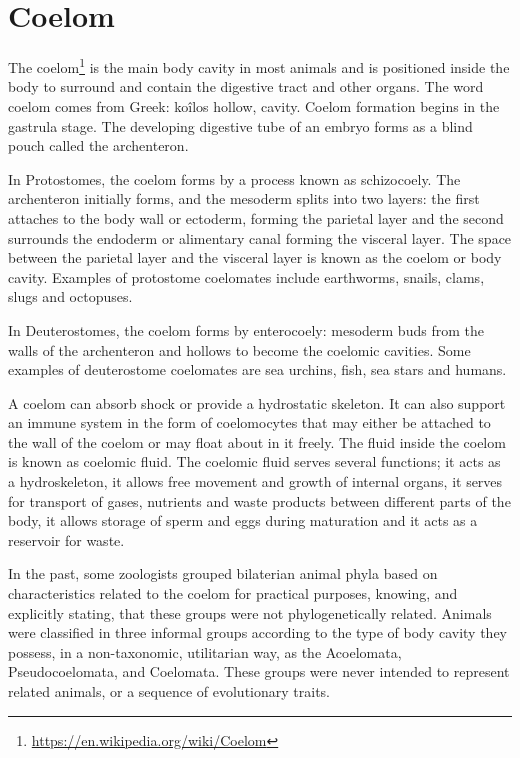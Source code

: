 \documentclass[]{book}
\let\rmarkdownfootnote\footnote%
\def\footnote{\protect\rmarkdownfootnote}
\renewcommand{\href}[2]{#2\footnote{\url{#1}}}
\begin{document}
\hypertarget{coelom}{%
\section{Coelom}\label{coelom}}

The \href{https://en.wikipedia.org/wiki/Coelom}{coelom} is the main body cavity in most animals and is positioned inside the body to surround and contain the digestive tract and other organs. The word coelom comes from Greek: koîlos hollow, cavity. Coelom formation begins in the gastrula stage. The developing digestive tube of an embryo forms as a blind pouch called the archenteron.

In Protostomes, the coelom forms by a process known as schizocoely. The archenteron initially forms, and the mesoderm splits into two layers: the first attaches to the body wall or ectoderm, forming the parietal layer and the second surrounds the endoderm or alimentary canal forming the visceral layer. The space between the parietal layer and the visceral layer is known as the coelom or body cavity. Examples of protostome coelomates include earthworms, snails, clams, slugs and octopuses.

In Deuterostomes, the coelom forms by enterocoely: mesoderm buds from the walls of the archenteron and hollows to become the coelomic cavities. Some examples of deuterostome coelomates are sea urchins, fish, sea stars and humans.

A coelom can absorb shock or provide a hydrostatic skeleton. It can also support an immune system in the form of coelomocytes that may either be attached to the wall of the coelom or may float about in it freely. The fluid inside the coelom is known as coelomic fluid. The coelomic fluid serves several functions; it acts as a hydroskeleton, it allows free movement and growth of internal organs, it serves for transport of gases, nutrients and waste products between different parts of the body, it allows storage of sperm and eggs during maturation and it acts as a reservoir for waste.

In the past, some zoologists grouped bilaterian animal phyla based on characteristics related to the coelom for practical purposes, knowing, and explicitly stating, that these groups were not phylogenetically related. Animals were classified in three informal groups according to the type of body cavity they possess, in a non-taxonomic, utilitarian way, as the Acoelomata, Pseudocoelomata, and Coelomata. These groups were never intended to represent related animals, or a sequence of evolutionary traits.
\end{document}
